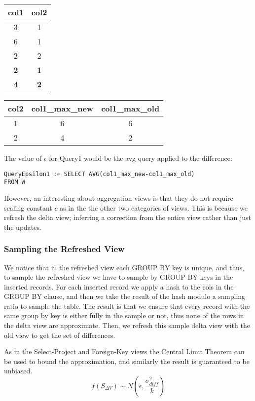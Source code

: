 \begin{center}
\begin{tabular}{|c|c|}
\hline 
col1 & col2\tabularnewline
\hline 
\hline 
3 & 1\tabularnewline
\hline 
6 & 1\tabularnewline
\hline 
2 & 2\tabularnewline
\hline 
\textbf{2} & \textbf{1}\tabularnewline
\hline 
\textbf{4} & \textbf{2}\tabularnewline
\hline 
\end{tabular} %
\begin{tabular}{|c|c|c|}
\hline 
col2 & col1\_max\_new & col1\_max\_old\tabularnewline
\hline 
\hline 
1 & 6 & 6\tabularnewline
\hline 
2 & 4 & 2\tabularnewline
\hline 
\end{tabular}
\par\end{center}

The value of $\epsilon$ for Query1 would be the avg query applied
to the difference:

\begin{lstlisting}
QueryEpsilon1 := SELECT AVG(col1_max_new-col1_max_old) 
FROM W
\end{lstlisting}

However, an interesting about aggregation views is that they do not 
require scaling constant $c$ as in the the other two categories of views.
This is because we refresh the delta view; inferring a correction from the
entire view rather than just the updates.

\subsubsection{Sampling the Refreshed View}
We notice that in the refreshed view each GROUP BY key is unique, and
thus, to sample the refreshed view we have to sample by GROUP BY keys
in the inserted records. For each inserted record we apply a hash
to the cols in the GROUP BY clause, and then we take the result of
the hash modulo a sampling ratio to sample the table. The result is
that we ensure that every record with the same group by key is either
fully in the sample or not, thus none of the rows in the delta view
are approximate. Then, we refresh this sample delta view with the old
view to get the set of differences.

As in the Select-Project and Foreign-Key views the Central Limit Theorem can
be used to bound the approximation, and similarly the result is guaranteed to be unbiased.
\[
f(S_{\Delta V})\sim N(\epsilon,\frac{\sigma_{diff}^{2}}{k})
\]
